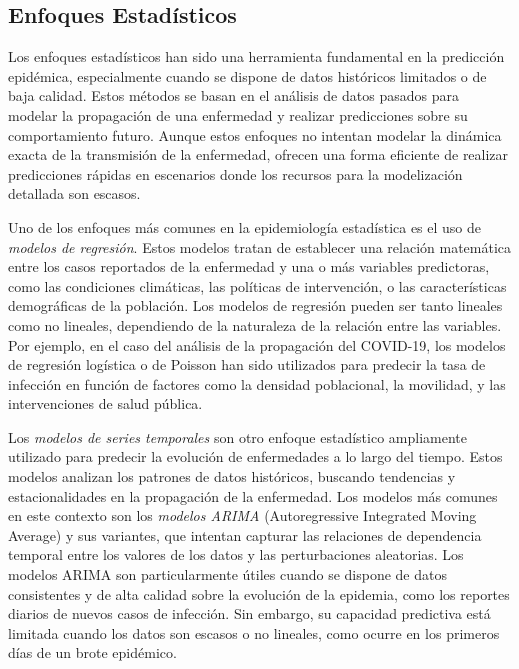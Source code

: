 \subsection{Enfoques Estadísticos}\label{section:statistical-approaches}

Los enfoques estadísticos han sido una herramienta fundamental en la predicción epidémica, especialmente cuando se dispone de datos históricos limitados o de baja calidad. Estos métodos se basan en el análisis de datos pasados para modelar la propagación de una enfermedad y realizar predicciones sobre su comportamiento futuro. Aunque estos enfoques no intentan modelar la dinámica exacta de la transmisión de la enfermedad, ofrecen una forma eficiente de realizar predicciones rápidas en escenarios donde los recursos para la modelización detallada son escasos.

Uno de los enfoques más comunes en la epidemiología estadística es el uso de \textit{modelos de regresión}. Estos modelos tratan de establecer una relación matemática entre los casos reportados de la enfermedad y una o más variables predictoras, como las condiciones climáticas, las políticas de intervención, o las características demográficas de la población. Los modelos de regresión pueden ser tanto lineales como no lineales, dependiendo de la naturaleza de la relación entre las variables. Por ejemplo, en el caso del análisis de la propagación del COVID-19, los modelos de regresión logística o de Poisson han sido utilizados para predecir la tasa de infección en función de factores como la densidad poblacional, la movilidad, y las intervenciones de salud pública.

Los \textit{modelos de series temporales} son otro enfoque estadístico ampliamente utilizado para predecir la evolución de enfermedades a lo largo del tiempo. Estos modelos analizan los patrones de datos históricos, buscando tendencias y estacionalidades en la propagación de la enfermedad. Los modelos más comunes en este contexto son los \textit{modelos ARIMA} (Autoregressive Integrated Moving Average) y sus variantes, que intentan capturar las relaciones de dependencia temporal entre los valores de los datos y las perturbaciones aleatorias. Los modelos ARIMA son particularmente útiles cuando se dispone de datos consistentes y de alta calidad sobre la evolución de la epidemia, como los reportes diarios de nuevos casos de infección. Sin embargo, su capacidad predictiva está limitada cuando los datos son escasos o no lineales, como ocurre en los primeros días de un brote epidémico.

